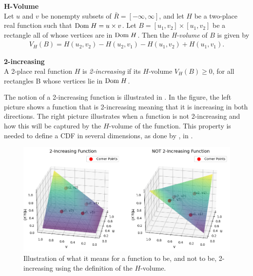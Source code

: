 \begin{definition}\label{def:H-volume} \textbf{H-Volume} \citet[p.~8]{Nelsen2006}\\
    Let $u$ and $v$ be nonempty subsets of $\bar{R} = [-\infty, \infty]$, and let $H$ be a two-place real function such that $\mathrm{Dom \;} H = u\times v$. Let $B = [u_1,v_2]\times[u_1,v_2]$  be a rectangle all of whose vertices are in $\mathrm{Dom \;} H$. Then
    the \emph{H-volume} of $B$ is given by
    \begin{align*}
        V_H(B) = H(u_2,v_2) - H(u_2,v_1) - H(u_1,v_2) + H(u_1,v_1).
    \end{align*}
\end{definition}

\begin{definition}\label{def:2-Increasing} \textbf{2-increasing} \citet[p.~8]{Nelsen2006}\\
     A 2-place real function $H$ is \emph{2-increasing} if its $H$-volume $V_H(B)\geq0$, for all rectangles B whose vertices lie in $\mathrm{Dom \;} H$.
\end{definition}

The notion of a 2-increasing function is illustrated in . In the figure, the left picture shows a function that is 2-increasing meaning that it is increasing in both directions. The right picture illustrates when a function is not 2-increasing and how this will be captured by the $H$-volume of the function. This property is needed to define a \gls{CDF} in several dimensions, as done by \citet[p.~17]{Nelsen2006}, in . 

\begin{figure}
    \centering
    \includegraphics[width=1\linewidth]{3Theory/pictures/2increasingAndNot.png}
    \caption{Illustration of what it means for a function to be, and not to be, 2-increasing using the definition of the $H$-volume.}
    \label{fig:2-Increasing}
\end{figure}


